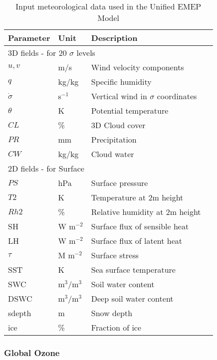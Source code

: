 \begin{table}[h!]
\caption{Input meteorological data used in the Unified EMEP Model
   \label{Tab:metinput}}
\begin{center}
\begin{tabular}{p{6cm}lll}
\hline
Parameter      & Unit & Description          \\
\hline
\multicolumn{3}{l}{3D fields - for 20 $\sigma$ levels} \\
$u,v$  &  m/s     & Wind velocity components   \\
$q$    &  kg/kg   & Specific humidity           \\
$\dot{\sigma}$ & s$^{-1}$ & Vertical wind in $\sigma$ coordinates \\
$\theta$       & K  & Potential temperature \\
$CL$             & \% & 3D Cloud cover            \\
$PR$             & mm & Precipitation         \\
$CW$             & kg/kg & Cloud water          \\
\hline
\multicolumn{3}{l}{2D fields - for Surface} \\
$PS$             & hPa & Surface pressure                     \\
$T2$          & K  & Temperature at 2m height               \\
$Rh2$             & \% & Relative humidity at 2m height \\
SH              & W m$^{-2}$ & Surface flux of sensible heat \\
LH             & W m$^{-2}$ & Surface flux of latent heat \\
$\tau$         & M m$^{-2}$ & Surface stress               \\
SST            & K & Sea surface temperature \\
SWC            & m$^3$/m$^{3}$ & Soil water content        \\
DSWC           & m$^3$/m$^{3}$ & Deep soil water content   \\
sdepth         & m & Snow depth \\
ice            & \% & Fraction of ice \\  
\hline
\end{tabular}
\end{center}
\end{table}



\subsubsection{Global Ozone}

